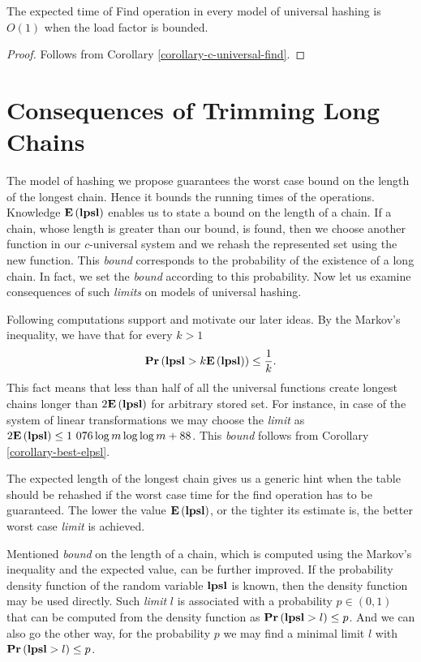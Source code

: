 \begin{corollary}
\label{corollary-find-time}
The expected time of Find operation in every model of universal hashing is $O(1)$ when the load factor is bounded.
\end{corollary}
\begin{proof}
Follows from Corollary \ref{corollary-c-universal-find}.
\end{proof}

\section{Consequences of Trimming Long Chains}
The model of hashing we propose guarantees the worst case bound on the length of the longest chain. Hence it bounds the running times of the operations. Knowledge $\mathbf{E}\left(\mathbf{lpsl}\right)$ enables us to state a bound on the length of a chain. If a chain, whose length is greater than our bound, is found, then we choose another function in our $c$-universal system and we rehash the represented set using the new function. This \emph{bound} corresponds to the probability of the existence of a long chain. In fact, we set the \emph{bound} according to this probability. Now let us examine consequences of such \emph{limits} on models of universal hashing.

Following computations support and motivate our later ideas. By the Markov's inequality, we have that for every $k > 1$ \[ \mathbf{Pr}\left(\mathbf{lpsl} > k \mathbf{E}\left(\mathbf{lpsl}\right)\right) \leq \frac{1}{k} \text{.} \] This fact means that less than half of all the universal functions create longest chains longer than $2 \mathbf{E}\left(\mathbf{lpsl}\right)$ for arbitrary stored set. For instance, in case of the system of linear transformations we may choose the \emph{limit} as $2\mathbf{E}\left(\mathbf{lpsl}\right) \leq \text{1 076} \log m \log \log m + 88$. This \emph{bound} follows from Corollary \ref{corollary-best-elpsl}.

The expected length of the longest chain gives us a generic hint when the table should be rehashed if the worst case time for the find operation has to be guaranteed. The lower the value $\mathbf{E}\left(\mathbf{lpsl}\right)$, or the tighter its estimate is, the better worst case \emph{limit} is achieved.

Mentioned \emph{bound} on the length of a chain, which is computed using the Markov's inequality and the expected value, can be further improved. If the probability density function of the random variable $\mathbf{lpsl}$ is known, then the density function may be used directly. Such \emph{limit} $l$ is associated with a probability $p \in (0, 1)$ that can be computed from the density function as $\mathbf{Pr}\left(\mathbf{lpsl} > l\right) \leq p$. And we can also go the other way, for the probability $p$ we may find a minimal limit $l$ with $\mathbf{Pr}\left(\mathbf{lpsl} > l\right) \leq p$.

